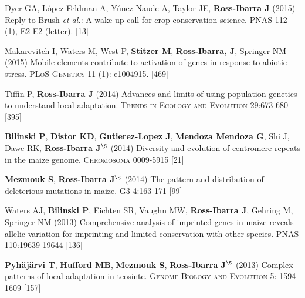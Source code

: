 \documentclass[letterpaper,10pt]{article}
\begin{document}
\begin{etaremune}
\item Dyer GA, L\'opez-Feldman A, Y\'unez-Naude A, Taylor JE, {\bf Ross-Ibarra J} (2015) Reply to Brush \emph{et al.}: A wake up call for crop conservation science. PNAS 112 (1), E2-E2 (letter).
 [13]\\


\item Makarevitch I, Waters M, West P, {\bf Stitzer M}, {\bf Ross-Ibarra, J}, Springer NM (2015) Mobile elements contribute to activation of genes in response to abiotic stress. \textsc{PLoS Genetics} 11 (1): e1004915. %
 [469]\\


\item Tiffin P, {\bf Ross-Ibarra J} (2014) Advances and limits of using population genetics to understand local adaptation. \textsc{Trends in Ecology and Evolution} 29:673-680 %
 [395]\\


\item {\bf Bilinski P}, {\bf Distor KD}, {\bf Gutierez-Lopez J}, {\bf Mendoza Mendoza G}, Shi J, Dawe RK,  {\bf Ross-Ibarra J}$^\S$ (2014) Diversity and evolution of centromere repeats in the maize genome. \textsc{Chromosoma} 0009-5915
 [21]\\

\item {\bf Mezmouk S}, {\bf Ross-Ibarra J}$^\S$ (2014) The pattern and distribution of deleterious mutations in maize. \textsc{G3} 4:163-171
 [99]\\

\item Waters AJ, {\bf Bilinski P}, Eichten SR, Vaughn MW, {\bf Ross-Ibarra J}, Gehring M, Springer NM (2013) Comprehensive analysis of imprinted genes in maize reveals allelic variation for imprinting and limited conservation with other species. \textsc{PNAS} 110:19639-19644
 [136]\\


\item {\bf Pyh\"aj\"arvi T}, {\bf Hufford MB}, {\bf Mezmouk S}, {\bf Ross-Ibarra J}$^\S$ (2013) Complex patterns of local adaptation in teosinte. \textsc{Genome Biology and Evolution} 5: 1594-1609 %
 [157]\\



\end{etaremune}
\end{document}
